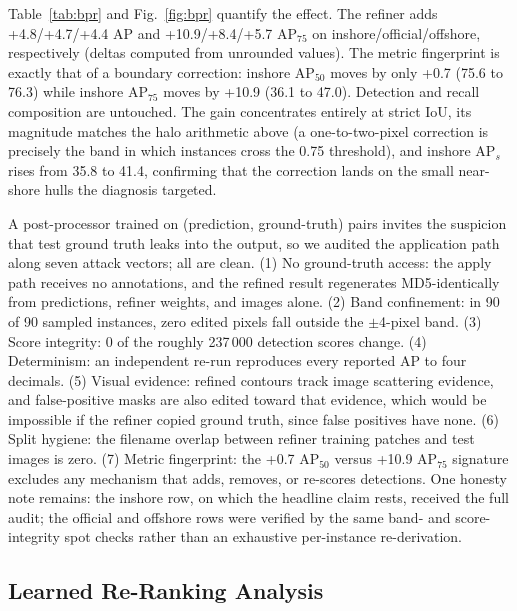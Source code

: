 Table~\ref{tab:bpr} and Fig.~\ref{fig:bpr} quantify the effect. The refiner adds +4.8/+4.7/+4.4 AP and +10.9/+8.4/+5.7 AP$_{75}$ on inshore/official/offshore, respectively (deltas computed from unrounded values). The metric fingerprint is exactly that of a boundary correction: inshore AP$_{50}$ moves by only +0.7 (75.6 to 76.3) while inshore AP$_{75}$ moves by +10.9 (36.1 to 47.0). Detection and recall composition are untouched. The gain concentrates entirely at strict IoU, its magnitude matches the halo arithmetic above (a one-to-two-pixel correction is precisely the band in which instances cross the 0.75 threshold), and inshore AP$_s$ rises from 35.8 to 41.4, confirming that the correction lands on the small near-shore hulls the diagnosis targeted.

A post-processor trained on (prediction, ground-truth) pairs invites the suspicion that test ground truth leaks into the output, so we audited the application path along seven attack vectors; all are clean. (1) No ground-truth access: the apply path receives no annotations, and the refined result regenerates MD5-identically from predictions, refiner weights, and images alone. (2) Band confinement: in 90 of 90 sampled instances, zero edited pixels fall outside the $\pm$4-pixel band. (3) Score integrity: 0 of the roughly 237\,000 detection scores change. (4) Determinism: an independent re-run reproduces every reported AP to four decimals. (5) Visual evidence: refined contours track image scattering evidence, and false-positive masks are also edited toward that evidence, which would be impossible if the refiner copied ground truth, since false positives have none. (6) Split hygiene: the filename overlap between refiner training patches and test images is zero. (7) Metric fingerprint: the +0.7 AP$_{50}$ versus +10.9 AP$_{75}$ signature excludes any mechanism that adds, removes, or re-scores detections. One honesty note remains: the inshore row, on which the headline claim rests, received the full audit; the official and offshore rows were verified by the same band- and score-integrity spot checks rather than an exhaustive per-instance re-derivation.

\subsection{Learned Re-Ranking Analysis}\label{sec:exp:rerank}

